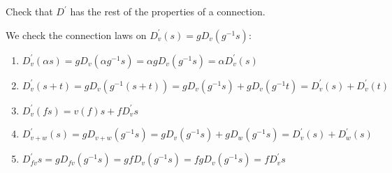 \documentclass[10pt]{article}
\begin{document}
\begin{example}
	Check that $D^\prime$ has the rest of the properties of a connection.
\end{example}
\sol We check the connection laws on $D_v^\prime(s) = gD_v(g^{-1}s)$:
\begin{enumerate}
	\item $D_v^\prime(\alpha s) = gD_v(\alpha g^{-1}s) = \alpha gD_v(g^{-1}s) = \alpha D_v^\prime(s)$
	\item $D_v^\prime(s + t) = gD_v(g^{-1}(s+t)) = gD_v(g^{-1}s) + gD_v(g^{-1}t) = D_v^\prime(s) + D_v^\prime(t)$
	\item $D_v^\prime(fs) = v(f)s+fD_v^\prime s$
	\item $D_{v+w}^\prime(s) = gD_{v+w}(g^{-1}s) = gD_v(g^{-1}s) + gD_w(g^{-1}s) = D_v^\prime(s) + D_w^\prime(s)$
	\item $D_{fv}^\prime s = gD_{fv}(g^{-1}s) = gfD_v(g^{-1}s) = fgD_v(g^{-1}s) =  fD_v^\prime s$
\end{enumerate}
\end{document}
